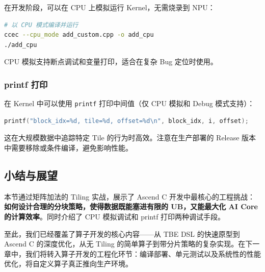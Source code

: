 在开发阶段，可以在 CPU 上模拟运行 Kernel，无需烧录到 NPU：

\begin{lstlisting}[language=bash]
# 以 CPU 模式编译并运行
ccec --cpu_mode add_custom.cpp -o add_cpu
./add_cpu
\end{lstlisting}

CPU 模拟支持断点调试和变量打印，适合在复杂 Bug 定位时使用。

\subsubsection{printf 打印}\label{src-book-chapter7-h60}

在 Kernel 中可以使用 \passthrough{\lstinline!printf!} 打印中间值（仅 CPU
模拟和 Debug 模式支持）：

\begin{lstlisting}[language={C++}]
printf("block_idx=%d, tile=%d, offset=%d\n", block_idx, i, offset);
\end{lstlisting}

这在大规模数据中追踪特定 Tile 的行为时高效。注意在生产部署的 Release
版本中需要移除或条件编译，避免影响性能。

\subsection{小结与展望}\label{src-book-chapter7-h61}

本节通过矩阵加法的 Tiling 实战，展示了 Ascend C
开发中最核心的工程挑战：\textbf{如何设计合理的分块策略，使得数据既能塞进有限的
UB，又能最大化 AI Core 的计算效率}。同时介绍了 CPU 模拟调试和 printf
打印两种调试手段。

至此，我们已经覆盖了算子开发的核心内容------从 TBE DSL 的快速原型到
Ascend C 的深度优化，从无 Tiling
的简单算子到带分片策略的复杂实现。在下一章中，我们将转入算子开发的工程化环节：编译部署、单元测试以及系统性的性能优化，将自定义算子真正推向生产环境。
